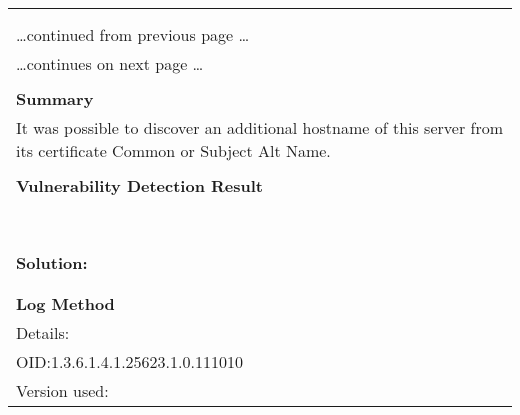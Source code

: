 \documentclass{article}
\begin{document}
\begin{longtable}{|p{}|}
\hline
\rowcolor{gvm_log}{\color{white}{Log (CVSS: 0.0) }}\\
\rowcolor{gvm_log}{\color{white}{NVT: SSL/TLS: Hostname discovery from server certificate}}\\
\hline
\endfirsthead
\hfill\ldots continued from previous page \ldots \\
\hline
\endhead
\hline
\ldots continues on next page \ldots \\
\endfoot
\hline
\endlastfoot
\\
\textbf{Summary}\\
It was possible to discover an additional hostname
  of this server from its certificate Common or Subject Alt Name.\\

        \hline
        \\
\textbf{Vulnerability Detection Result}\\
\rowcolor{white}{\verb=The following additional and resolvable hostnames were detected:=}\\
\rowcolor{white}{\verb=Breuelstrasse11=}\\
\rowcolor{white}{\verb=fritz.nas=}\\
\rowcolor{white}{\verb=myfritz.box=}\\
\rowcolor{white}{\verb=www.fritz.box=}\\
\rowcolor{white}{\verb=www.fritz.nas=}\\
\rowcolor{white}{\verb=www.myfritz.box=}\\

          \hline
          \\
\textbf{Solution:}\\
\\


        \hline
        \\
\textbf{Log Method}\\
Details:
\rowcolor{white}{\verb=SSL/TLS: Hostname discovery from server certificate=}\\
OID:1.3.6.1.4.1.25623.1.0.111010\\
Version used:
\rowcolor{white}{\verb=2021-11-22T15:32:39Z=}\\
\end{longtable}
\end{document}
